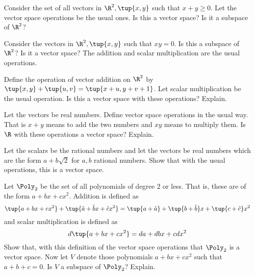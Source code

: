 \begin{enumialphparenastyle}
\begin{ex} Consider the set of all vectors in $\R^{2},\tup{x,y} $
such that $x+y\geq 0$. Let the vector space operations be the usual ones. Is
this a vector space? Is it a subspace of $\R^{2}$?
\end{ex}

\begin{ex} Consider the vectors in $\R^{2},\tup{x,y} $ such that $xy=0$. Is this a subspace of $\R^{2}$? Is it a vector space? The
addition and scalar multiplication are the usual operations.
\end{ex}

\begin{ex} Define the operation of vector addition on $\R^{2}$ by $\tup{
x,y} +\tup{u,v} =\tup{x+u,y+v+1}$. Let scalar
multiplication be the usual operation. Is this a vector space with these
operations? Explain.
\end{ex}

\begin{ex} Let the vectors be real numbers. Define vector space operations in the
usual way. That is $x+y$ means to add the two numbers and $xy$ means to
multiply them. Is $\R$ with these operations a vector space? Explain.
\end{ex}

\begin{ex} Let the scalars be the rational numbers and let the vectors be
real numbers which are the form $a+b\sqrt{2}$ for $a,b$ rational numbers.
Show that with the usual operations, this is a vector space.
\end{ex}

\begin{ex} Let $\Poly_{2}$ be the set of all polynomials of degree 2 or
less. That is, these are of the form $a+bx+cx^{2}$. Addition is defined as 
\begin{equation*}
\tup{a+bx+cx^{2}} +\tup{\hat{a}+\hat{b}x+\hat{c}x^{2}}
=\tup{a+\hat{a}} +\tup{b+\hat{b}} x+\tup{c+\hat{c}}
x^{2}
\end{equation*}
and scalar multiplication is defined as 
\begin{equation*}
d\tup{a+bx+cx^{2}} =da+dbx+cdx^{2}
\end{equation*}
Show that, with this definition of the vector space operations that $\Poly_{2}$ is a vector space. Now let $V$ denote those polynomials $a+bx+cx^{2}$
such that $a+b+c=0$. Is $V$ a subspace of $\Poly_{2}$? Explain.
\end{ex}


\end{enumialphparenastyle}

